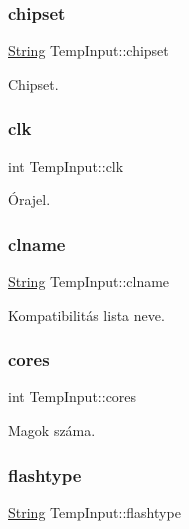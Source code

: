 \subsubsection{\texorpdfstring{chipset}{chipset}}
{\footnotesize\ttfamily \mbox{\hyperlink{class_string}{String}} Temp\+Input\+::chipset}



Chipset. 

\mbox{\label{struct_temp_input_aa76fe14a614fef6e9239ce2283d6b102}} 
\subsubsection{\texorpdfstring{clk}{clk}}
{\footnotesize\ttfamily int Temp\+Input\+::clk}



Órajel. 

\mbox{\label{struct_temp_input_a623b1fe5692319aad5c58cbc42bedf9c}} 
\subsubsection{\texorpdfstring{clname}{clname}}
{\footnotesize\ttfamily \mbox{\hyperlink{class_string}{String}} Temp\+Input\+::clname}



Kompatibilitás lista neve. 

\mbox{\label{struct_temp_input_a9b99532e6c984fb19c34ed943a6d5750}} 
\subsubsection{\texorpdfstring{cores}{cores}}
{\footnotesize\ttfamily int Temp\+Input\+::cores}



Magok száma. 

\mbox{\label{struct_temp_input_aca0d9830369aab845fc274c6b54ffe33}} 
\subsubsection{\texorpdfstring{flashtype}{flashtype}}
{\footnotesize\ttfamily \mbox{\hyperlink{class_string}{String}} Temp\+Input\+::flashtype}



